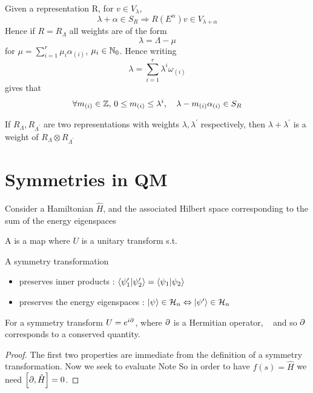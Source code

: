 \documentclass{article}
\begin{document}
\begin{fact}
Given a representation R, for $v\in V_\lambda$, 
\[
\lambda+\alpha\in S_R \Rightarrow R(E^\alpha)v \in V_{\lambda+\alpha}
\]
Hence if $R=R_\Lambda$ all weights are of the form 
\[
\lambda=\Lambda-\mu
\]
for $\mu=\sum_{i=1}^r \mu_i \alpha_{(i)}$, $\mu_i\in\mbb{N}_0$. Hence writing 
\[
\lambda=\sum_{i=1}^r \lambda^i \omega_{(i)}
\]
gives that
\[
\forall m_{(i)}\in\mbb{Z}, \, 0\leq m_{(i)}\leq \lambda^i, \quad \lambda-m_{(i)}\alpha_{(i)}\in S_R
\]
\end{fact}

\begin{lemma}
If $R_\Lambda, R_{\Lambda^\prime}$ are two representations with weights $\lambda,\lambda^\prime$ respectively, then $\lambda+\lambda^\prime$ is a weight of $R_\Lambda \otimes R_{\Lambda^\prime}$
\end{lemma}
\section{Symmetries in QM}

Consider a Hamiltonian $\hat{H}$, and the associated Hilbert space corresponding to the sum of the energy eigenspaces 

\begin{definition}
A  is a map 
where $U$ is a unitary transform s.t. 
\end{definition}

\begin{prop}
A symmetry transformation 
\begin{itemize}
    \item preserves inner products : $\braket{\psi_1^\prime | \psi_2^\prime } = \braket{\psi_1 | \psi_2}$
    \item preserves the energy eigenspaces : $\ket{\psi} \in \mc{H}_n \Leftrightarrow \ket{\psi^\prime} \in \mc{H}_n$
\end{itemize}
For a symmetry transform $U= e^{i \del}$, where $\del$ is a Hermitian operator, \
and so $\del$ corresponds to a conserved quantity. 
\end{prop}
\begin{proof}
The first two properties are immediate from the definition of a symmetry transformation. 
Now we seek to evaluate 
Note 
So in order to have $f(s) = \hat{H}$ we need $\comm[\del]{\hat{H}} = 0$.
\end{proof}
\end{document}

